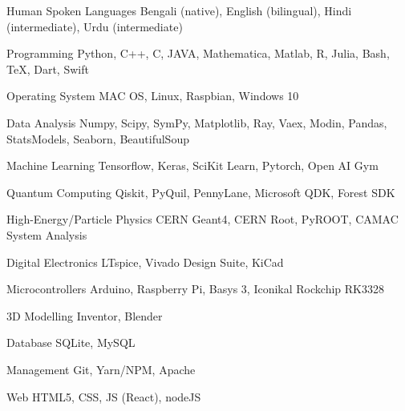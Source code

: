 
\begin{cvskills}

    \cvskill
    {Human Spoken Languages}
    {Bengali (native), English (bilingual), Hindi (intermediate), Urdu (intermediate)}

    \cvskill
    {Programming}
    {Python, C++, C, JAVA, Mathematica, Matlab, R, Julia, Bash, \TeX, Dart, Swift}

    \cvskill
    {Operating System}
    {MAC OS, Linux, Raspbian, Windows 10}

    \cvskill
    {Data Analysis}
    {Numpy, Scipy, SymPy, Matplotlib, Ray, Vaex, Modin, Pandas, StatsModels, Seaborn, BeautifulSoup}


    \cvskill
    {Machine Learning}
    {Tensorflow, Keras, SciKit Learn, Pytorch, Open AI Gym}


    \cvskill
    {Quantum Computing}
    {Qiskit, PyQuil, PennyLane, Microsoft QDK, Forest SDK}

    \cvskill
    {High-Energy/Particle Physics}
    {CERN Geant4, CERN Root, PyROOT, CAMAC System Analysis}

    \cvskill
    {Digital Electronics}
    {LTspice, Vivado Design Suite, KiCad}

    \cvskill
    {Microcontrollers}
    {Arduino, Raspberry Pi, Basys 3, Iconikal Rockchip RK3328}

    \cvskill
    {3D Modelling}
    {Inventor, Blender}

    \cvskill
    {Database}
    {SQLite, MySQL}

    \cvskill
    {Management}
    {Git, Yarn/NPM, Apache}

    \cvskill
    {Web}
    {HTML5, CSS, JS (React), nodeJS}

\end{cvskills}
